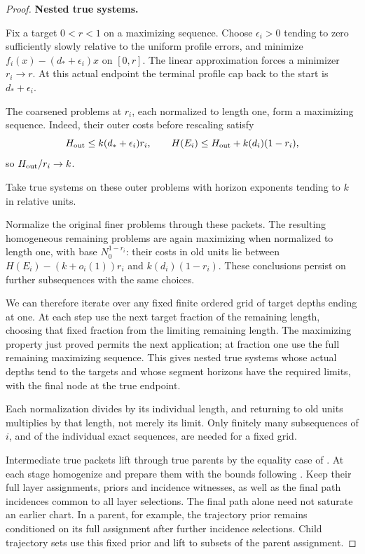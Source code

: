 \begin{proof}
\par\smallskip\noindent\textbf{Nested true systems.}\quad

Fix a target \(0<r<1\) on a maximizing sequence.  Choose
\(\epsilon_i>0\) tending to zero sufficiently slowly relative to
the uniform profile errors, and minimize
\(f_i(x)-(d_*+\epsilon_i)x\) on \([0,r]\).
The linear approximation forces a minimizer \(r_i\to r\).
At this actual endpoint the terminal profile cap back to the start
is \(d_*+\epsilon_i\).

The coarsened problems at \(r_i\), each normalized to length one,
form a maximizing sequence.  Indeed, their outer costs before
rescaling satisfy
\begin{equation}
H_{\rm out}\le k(d_*+\epsilon_i)r_i,\qquad
 H(E_i)\le H_{\rm out}+k(d_i)(1-r_i),
\end{equation}
so \(H_{\rm out}/r_i\to k\).

Take true systems on these outer problems with horizon exponents tending to \(k\) in relative units.

Normalize the original finer problems through these packets.
The resulting homogeneous remaining problems are again maximizing
when normalized to length one, with base \(N_0^{1-r_i}\): their
costs in old units lie between
\(H(E_i)-(k+o_i(1))r_i\) and \(k(d_i)(1-r_i)\).
These conclusions persist on further subsequences with the same
choices.

We can therefore iterate over any fixed finite ordered grid of
target depths ending at one.  At each step use the next target
fraction of the remaining length, choosing that fixed fraction
from the limiting remaining length.  The maximizing property just
proved permits the next application; at fraction one use the full
remaining maximizing sequence.  This gives nested true systems
whose actual depths tend to the targets and whose segment horizons
have the required limits, with the final node at the true endpoint.

Each normalization divides by its individual length, and returning
to old units multiplies by that length, not merely its limit.
Only finitely many subsequences of \(i\), and of the individual
exact sequences, are needed for a fixed grid.

Intermediate true packets lift through true parents by the equality
case of .  At each stage homogenize and
prepare them with the bounds following .
Keep their full layer assignments, priors and incidence witnesses,
as well as the final path incidences common to all layer selections.
The final path alone need not saturate an earlier chart.
In a parent, for example, the trajectory prior remains conditioned
on its full assignment after further incidence selections.
Child trajectory sets use this fixed prior and lift to subsets
of the parent assignment.


\end{proof}
